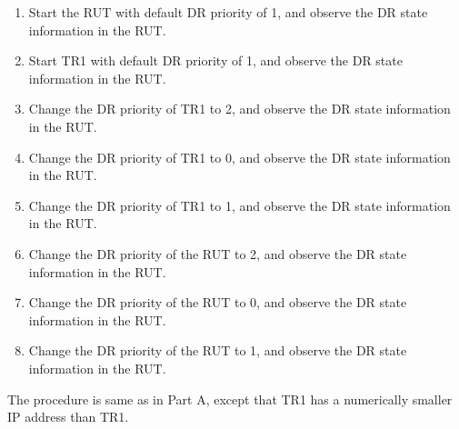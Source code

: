 \documentclass[11pt]{report}
\begin{document}


\begin{enumerate}

  \item Start the RUT with default DR priority of 1, and
        observe the DR state information in the RUT.

  \item Start TR1 with default DR priority of 1, and
        observe the DR state information in the RUT.

  \item Change the DR priority of TR1 to 2, and
        observe the DR state information in the RUT.

  \item Change the DR priority of TR1 to 0, and
        observe the DR state information in the RUT.

  \item Change the DR priority of TR1 to 1, and
        observe the DR state information in the RUT.

  \item Change the DR priority of the RUT to 2, and
        observe the DR state information in the RUT.

  \item Change the DR priority of the RUT to 0, and
        observe the DR state information in the RUT.

  \item Change the DR priority of the RUT to 1, and
        observe the DR state information in the RUT.

\end{enumerate}


The procedure is same as in Part A, except that TR1 has a numerically smaller
IP address than TR1.


\end{document}
